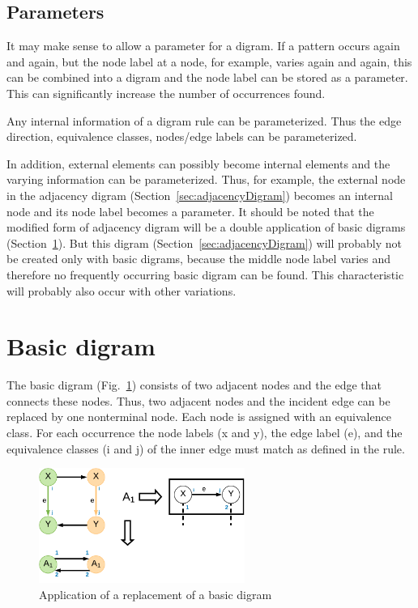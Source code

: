 \subsection*{Parameters}

It may make sense to allow a parameter for a digram. If a pattern occurs again and again, but the node label at a node, for example, varies again and again, this can be combined into a digram and the node label can be stored as a parameter. This can significantly increase the number of occurrences found.

Any internal information of a digram rule can be parameterized. Thus the edge direction, equivalence classes, nodes/edge labels can be parameterized.

In addition, external elements can possibly become internal elements and the varying information can be parameterized. Thus, for example, the external node in the adjacency digram (Section~\ref{sec:adjacencyDigram}) becomes an internal node and its node label becomes a parameter.
It should be noted that the modified form of adjacency digram will be a double application of basic digrams (Section~\ref{sec:basicDigram}). But this digram (Section~\ref{sec:adjacencyDigram}) will probably not be created only with basic digrams, because the middle node label varies and therefore no frequently occurring basic digram can be found. This characteristic will probably also occur with other variations.




\section{Basic digram}
\label{sec:basicDigram}


The basic digram (Fig.~\ref{fig:basicDigram}) consists of two adjacent nodes and the edge that connects these nodes. Thus, two adjacent nodes and the incident edge can be replaced by one nonterminal node. Each node is assigned with an equivalence class. For each occurrence the node labels (x and y), the edge label (e), and the equivalence classes (i and j) of the inner edge must match as defined in the rule.

\begin{figure}[h]
	\centering
	\includegraphics[width=0.6\textwidth]{chapters/imgConcept/basicDigram}
	\caption{Application of a replacement of a basic digram}
	\label{fig:basicDigram}
\end{figure}

